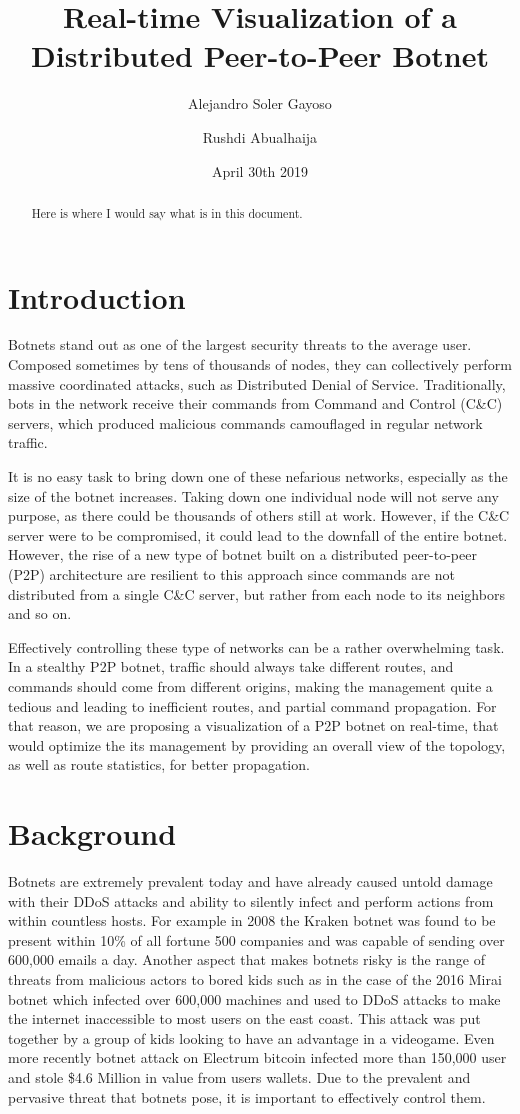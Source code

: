 \documentclass{proc}
\title{Real-time Visualization of a Distributed Peer-to-Peer Botnet}
\author[1]{Alejandro Soler Gayoso}
\author[2]{Rushdi Abualhaija}
\affil[1]{Worcester Polytechnic Institute, asolergayoso@wpi.edu}
\affil[2]{Worcester Polytechnic Institute, rmabualhaija@wpi.edu}
\date{April 30th 2019}
\begin{document}
\maketitle
\begin{abstract}
	Here is where I would say what is in this document.
\end{abstract}

\section{Introduction}
Botnets stand out as one of the largest security threats to the average user. Composed sometimes by tens of thousands of nodes, they can collectively perform massive coordinated attacks, such as Distributed Denial of Service. Traditionally, bots in the network receive their commands from Command and Control (C\&C) servers, which produced malicious commands camouflaged in regular network traffic. 


It is no easy task to bring down one of these nefarious networks, especially as the size of the botnet increases. Taking down one individual node will not serve any purpose, as there could be thousands of others still at work. However, if the C&C server were to be compromised, it could lead to the downfall of the entire botnet. However, the rise of a new type of botnet built on a distributed peer-to-peer (P2P) architecture are resilient to this approach since commands are not distributed from a single C\&C server, but rather from each node to its neighbors and so on. 


Effectively controlling these type of networks can be a rather overwhelming task. In a stealthy P2P
botnet, traffic should always take different routes, and commands should come from different origins, making the management quite a tedious and leading to inefficient routes, and partial command propagation. For that reason, we are proposing a visualization of a P2P botnet on real-time, that would optimize the its management by providing an overall view of the topology, as well as route statistics, for better propagation. 
\section{Background}

Botnets are extremely prevalent today and have already caused untold damage with their DDoS attacks and ability to silently infect and perform actions from within countless hosts. For example in 2008 the Kraken botnet was found to be present within 10\% of all fortune 500 companies and was capable of sending over 600,000 emails a day. Another aspect that makes botnets risky is the range of threats from malicious actors to bored kids such as in the case of the 2016 Mirai botnet which infected over 600,000 machines and used to DDoS attacks to make the internet inaccessible to most users on the east coast. This attack was put together by a group of kids looking to have an advantage in a videogame\cite{WhiteOps}. Even more recently botnet attack on Electrum bitcoin infected more than 150,000 user and stole \$4.6 Million in value from users wallets. Due to the prevalent and pervasive threat that botnets pose, it is important to effectively control them.
\end{document}
